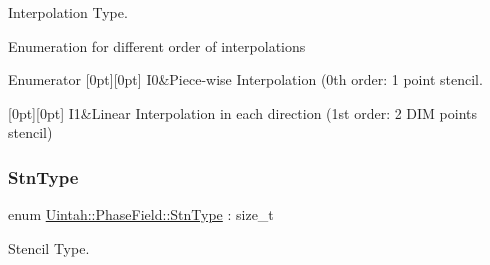 Interpolation Type. 

Enumeration for different order of interpolations \begin{DoxyEnumFields}{Enumerator}
[0pt][0pt]{}\mbox{\label{namespaceUintah_1_1PhaseField_a547ce3002aa97fbd3ef3192a6eec8406abdd8ebcbdfd71d1125937e3012dc45fb}} 
I0&Piece-\/wise Interpolation (0th order\+: 1 point stencil. \\
\hline

[0pt][0pt]{}\mbox{\label{namespaceUintah_1_1PhaseField_a547ce3002aa97fbd3ef3192a6eec8406a66f19efe774b0d2b6e5844eb2d83d305}} 
I1&Linear Interpolation in each direction (1st order\+: 2 D\+IM points stencil) \\
\hline

\end{DoxyEnumFields}
\mbox{\label{namespaceUintah_1_1PhaseField_a24d833a720598df1020f5cc2e75f8702}} 
\subsubsection{\texorpdfstring{Stn\+Type}{StnType}}
{\footnotesize\ttfamily enum \hyperlink{namespaceUintah_1_1PhaseField_a24d833a720598df1020f5cc2e75f8702}{Uintah\+::\+Phase\+Field\+::\+Stn\+Type} \+: size\+\_\+t}



Stencil Type. 

